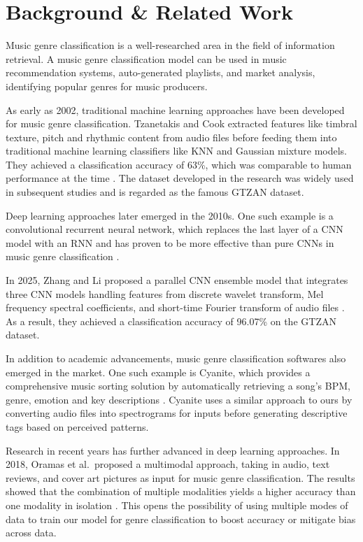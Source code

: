 \documentclass{article} %
\begin{document}
\section{Background \& Related Work}

Music genre classification is a well-researched area in the field of information retrieval. A music genre classification model can be used in music recommendation systems, auto-generated playlists, and market analysis, identifying popular genres for music producers.

As early as 2002, traditional machine learning approaches have been developed for music genre classification. Tzanetakis and Cook extracted features like timbral texture, pitch and rhythmic content from audio files before feeding them into traditional machine learning classifiers like KNN and Gaussian mixture models. They achieved a classification accuracy of 63\%, which was comparable to human performance at the time \citep{tzanetakis2002}. The dataset developed in the research was widely used in subsequent studies and is regarded as the famous GTZAN dataset.

Deep learning approaches later emerged in the 2010s. One such example is a convolutional recurrent neural network, which replaces the last layer of a CNN model with an RNN and has proven to be more effective than pure CNNs in music genre classification \citep{choi2017crnn}.

In 2025, Zhang and Li proposed a parallel CNN ensemble model that integrates three CNN models handling features from discrete wavelet transform, Mel frequency spectral coefficients, and short-time Fourier transform of audio files \citep{zhang2025ensemble}. As a result, they achieved a classification accuracy of 96.07\% on the GTZAN dataset.

In addition to academic advancements, music genre classification softwares also emerged in the market. One such example is Cyanite, which provides a comprehensive music sorting solution by automatically retrieving a song’s BPM, genre, emotion and key descriptions \citep{cyanite_ai}. Cyanite uses a similar approach to ours by converting audio files into spectrograms for inputs before generating descriptive tags based on perceived patterns.

Research in recent years has further advanced in deep learning approaches. In 2018, Oramas et al.\ proposed a multimodal approach, taking in audio, text reviews, and cover art pictures as input for music genre classification. The results showed that the combination of multiple modalities yields a higher accuracy than one modality in isolation \citep{oramas2018multimodal}. This opens the possibility of using multiple modes of data to train our model for genre classification to boost accuracy or mitigate bias across data.
\end{document}
